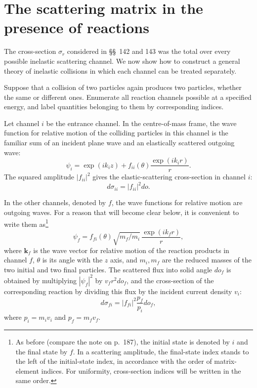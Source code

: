 \section{The scattering matrix in the presence of reactions}

The cross-section $\sigma_r$ considered in \S\S~142 and 143 was the total over every possible inelastic scattering channel. We now show how to construct a general theory of inelastic collisions in which each channel can be treated separately.

Suppose that a collision of two particles again produces two particles, whether the same or different ones. Enumerate all reaction channels possible at a specified energy, and label quantities belonging to them by corresponding indices.

Let channel $i$ be the entrance channel. In the centre-of-mass frame, the wave function for relative motion of the colliding particles in this channel is the familiar sum of an incident plane wave and an elastically scattered outgoing wave:
\begin{equation}
 \psi_i=\exp(ik_i z)+f_{ii}(\theta)\frac{\exp(ik_i r)}r.
 \tag{144.1}
\end{equation}
The squared amplitude $|f_{ii}|^2$ gives the elastic-scattering cross-section in channel $i$:
\begin{equation}
 d\sigma_{ii}=|f_{ii}|^2d\mathit{o}.
 \tag{144.2}
\end{equation}

In the other channels, denoted by $f$, the wave functions for relative motion are outgoing waves. For a reason that will become clear below, it is convenient to write them as\footnote{As before (compare the note on p.~187), the initial state is denoted by $i$ and the final state by $f$. In a scattering amplitude, the final-state index stands to the left of the initial-state index, in accordance with the order of matrix-element indices. For uniformity, cross-section indices will be written in the same order.}
\begin{equation}
 \psi_f=f_{fi}(\theta)\sqrt{m_f/m_i}\,\frac{\exp(ik_f r)}r,
 \tag{144.3}
\end{equation}
where $\mathbf{k}_f$ is the wave vector for relative motion of the reaction products in channel $f$, $\theta$ is its angle with the $z$ axis, and $m_i,m_f$ are the reduced masses of the two initial and two final particles. The scattered flux into solid angle $d\mathit{o}_f$ is obtained by multiplying $|\psi_f|^2$ by $v_fr^2d\mathit{o}_f$, and the cross-section of the corresponding reaction by dividing this flux by the incident current density $v_i$:
\begin{equation}
 d\sigma_{fi}=|f_{fi}|^2\frac{p_f}{p_i}d\mathit{o}_f,
 \tag{144.4}
\end{equation}
where $p_i=m_iv_i$ and $p_f=m_fv_f$.

